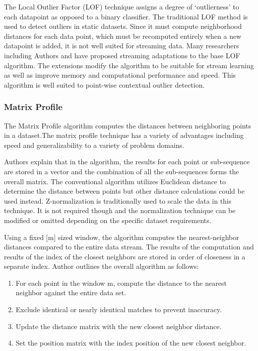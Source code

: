 The Local Outlier Factor (LOF) technique assigns a degree of `outlierness' to each datapoint as opposed to a binary classifier. The traditional LOF method is used to detect outliers in static datasets. Since it must compute neighborhood distances for each data point, which must be recomputed entirely when a new datapoint is added, it is not well suited for streaming data. Many researchers including Authors \cite{dilof-data-streams} and \cite{fast-memory-efficent-lof-milof} have proposed streaming adaptations to the base LOF algorithm. The extensions modify the algorithm to be suitable for stream learning as well as improve memory and computational performance and speed. This algorithm is well suited to point-wise contextual outlier detection.

\subsubsection{Matrix Profile} %
\label{ref_matrix-profile-alg}
The Matrix Profile algorithm computes the distances between neighboring points in a dataset.The matrix profile technique has a variety of advantages including speed and generalizability to a variety of problem domains.

Authors \cite{yeh2016matrix-profile-1} explain that in the algorithm, the results for each point or sub-sequence are stored in a vector and the combination of all the sub-sequences forms the overall matrix. The conventional algorithm utilizes Euclidean distance to determine the distance between points but other distance calculations could be used instead. Z-normalization is traditionally used to scale the data in this technique. It is not required though and the normalization technique can be modified or omitted depending on the specific dataset requirements.

Using a fixed [m] sized window, the algorithm computes the nearest-neighbor distances compared to the entire data stream. The results of the computation and results of the index of the closest neighbors are stored in order of closeness in a separate index. Author \cite{matrix-profile-intro} outlines the overall algorithm as follows:
\begin{enumerate}
    \item For each point in the window m, compute the distance to the nearest neighbor against the entire data set.
    \item Exclude identical or nearly identical matches to prevent inaccuracy.
    \item Update the distance matrix with the new closest neighbor distance.
    \item Set the position matrix with the index position of the new closest neighbor.
\end{enumerate}

